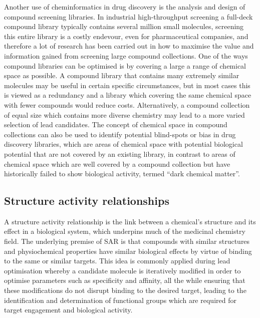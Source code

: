 \documentclass[a4paper,11pt,twoside,openright]{scrbook}
\begin{document}
Another use of cheminformatics in drug discovery is the analysis and design of compound screening libraries.
In industrial high-throughput screening a full-deck compound library typically contains several million small molecules, screening this entire library is a costly endevour, even for pharmaceutical companies, and therefore a lot of research has been carried out in how to maximise the value and information gained from screening large compound collections.
One of the ways compound libraries can be optimised is by covering a large a range of chemical space as possible.
A compound library that contains many extremely similar molecules may be useful in certain specific circumstances, but in most cases this is viewed as a redundancy and a library which covering the same chemical space with fewer compounds would reduce costs.
Alternatively, a compound collection of equal size which contains more diverse chemistry may lead to a more varied selection of lead candidates. \cite{Clemons2011}
The concept of chemical space in compound collections can also be used to identify potential blind-spots or bias in drug discovery libraries, which are areas of chemical space with potential biological potential that are not covered by an existing library, in contrast to areas of chemical space which are well covered by a compound collection but have historically failed to show biological activity, termed ``dark chemical matter''. \cite{Wassermann2015}


\subsection{Structure activity relationships}
A structure activity relationship is the link between a chemical's structure and its effect in a biological system, which underpins much of the medicinal chemistry field.
The underlying premise of SAR is that compounds with similar structures and physiochemical properties have similar biological effects by virtue of binding to the same or similar targets.
This idea is commonly applied during lead optimisation whereby a candidate molecule is iteratively modified in order to optimise parameters such as specificity and affinity, all the while ensuring that these modifications do not disrupt binding to the desired target, leading to the identification and determination of functional groups which are required for target engagement and biological activity.
\end{document}
